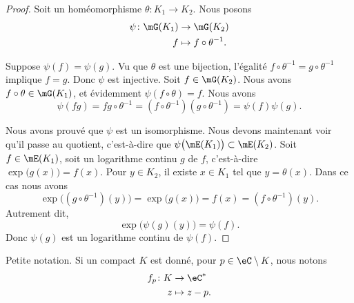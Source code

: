 \begin{proof}
	Soit un homéomorphisme \( \theta\colon K_1\to K_2\). Nous posons
	\begin{equation}
		\begin{aligned}
			\psi\colon \mG(K_1) & \to \mG(K_2)                \\
			f                   & \mapsto f\circ \theta^{-1}.
		\end{aligned}
	\end{equation}
	\begin{subproof}
		\spitem[Injective]
		Suppose \( \psi(f)=\psi(g)\). Vu que \( \theta\) est une bijection, l'égalité \( f\circ \theta^{-1}=g\circ\theta^{-1}\) implique \( f=g\). Donc \( \psi\) est injective.
		\spitem[Surjective]
		Soit \( f\in\mG(K_2)\). Nous avons \( f\circ\theta\in\mG(K_1)\), et évidemment \( \psi(f\circ\theta)=f\).
		\spitem[Morphisme]
		Nous avons
		\begin{equation}
			\psi(fg)=fg\circ\theta^{-1}=(f\circ\theta^{-1})(g\circ\theta^{-1})=\psi(f)\psi(g).
		\end{equation}
	\end{subproof}
	Nous avons prouvé que \( \psi\) est un isomorphisme. Nous devons maintenant voir qu'il passe au quotient, c'est-à-dire que \( \psi\big( \mE(K_1) \big)\subset\mE(K_2)\). Soit \( f\in\mE(K_1)\), soit un logarithme continu \( g\) de \( f\), c'est-à-dire \( \exp\big( g(x) \big)=f(x)\). Pour \( y\in K_2\), il existe \( x\in K_1\) tel que \( y=\theta(x)\). Dans ce cas nous avons
	\begin{equation}
		\exp\big( (g\circ\theta^{-1})(y) \big)=\exp\big( g(x) \big)=f(x)=(f\circ\theta^{-1})(y).
	\end{equation}
	Autrement dit,
	\begin{equation}
		\exp\big( \psi(g)(y) \big)=\psi(f).
	\end{equation}
	Donc \( \psi(g)\) est un logarithme continu de \( \psi(f)\).
\end{proof}

\begin{definition}		\label{DEFooKXHUooTsKuOe}
	Petite notation. Si un compact \( K\) est donné, pour \( p\in\eC\setminus K\), nous notons
	\begin{equation}
		\begin{aligned}
			f_p\colon K & \to \eC^*    \\
			z           & \mapsto z-p.
		\end{aligned}
	\end{equation}
\end{definition}

